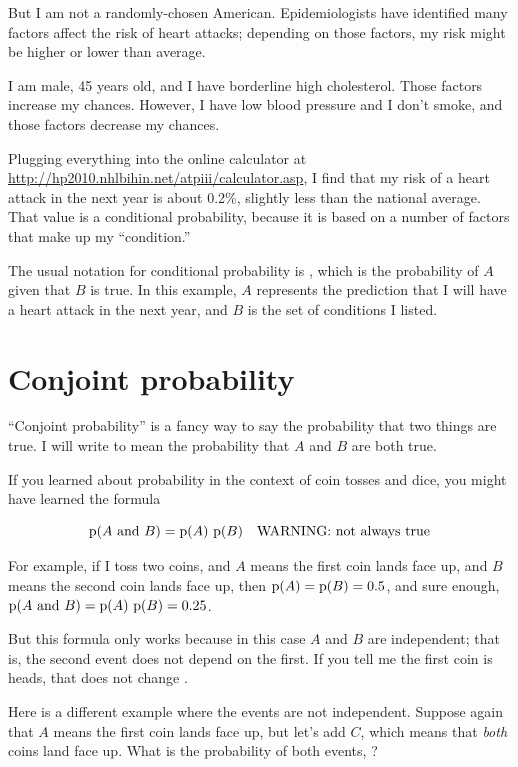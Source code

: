 \documentclass[12pt]{book}
\begin{document}
But I am not a randomly-chosen American.  Epidemiologists have
identified many factors affect the risk of heart attacks; depending on
those factors, my risk might be higher or lower than average.

I am male, 45 years old, and I have
borderline high cholesterol.  Those factors increase my chances.
However, I have low blood pressure and I don't smoke, and
those factors decrease my chances.

Plugging everything into the online calculator at
\url{http://hp2010.nhlbihin.net/atpiii/calculator.asp}, I find that my
risk of a heart attack in the next year is about 0.2\%, slightly
less than the national average.
That value is a conditional probability, because it is based on
a number of factors that make up my ``condition.''

The usual notation for conditional probability is , which
is the probability of $A$ given that $B$ is true.  In this
example, $A$ represents the prediction that I will have a heart
attack in the next year, and $B$ is the set of conditions I listed.


\section{Conjoint probability}

``Conjoint probability'' is a fancy way to say the probability that
two things are true.  I will write  to mean the
probability that $A$ and $B$ are both true.

If you learned about probability in the context of coin tosses and
dice, you might have learned the formula

\[ \mathrm{p}(A ~\mathrm{and}~ B) = \mathrm{p}(A)~\mathrm{p}(B) \quad\mbox{WARNING: not always true}\]

For example, if I toss two coins, and $A$ means the first coin lands
face up, and $B$ means the second coin lands face up, then $\mathrm{p}(A) =
\mathrm{p}(B) = 0.5$, and sure enough, $\mathrm{p}(A ~\mathrm{and}~ B) = \mathrm{p}(A)~\mathrm{p}(B) = 0.25$.

But this formula only works because in this case $A$ and $B$ are
independent; that is, the second event does not depend on the first.
If you tell me the first coin is heads, that does not change .

Here is a different example where the events are not independent.
Suppose again that $A$ means the first coin lands face up, but let's
add $C$, which means that {\em both} coins land face up.  What is the
probability of both events, ?
\end{document}
